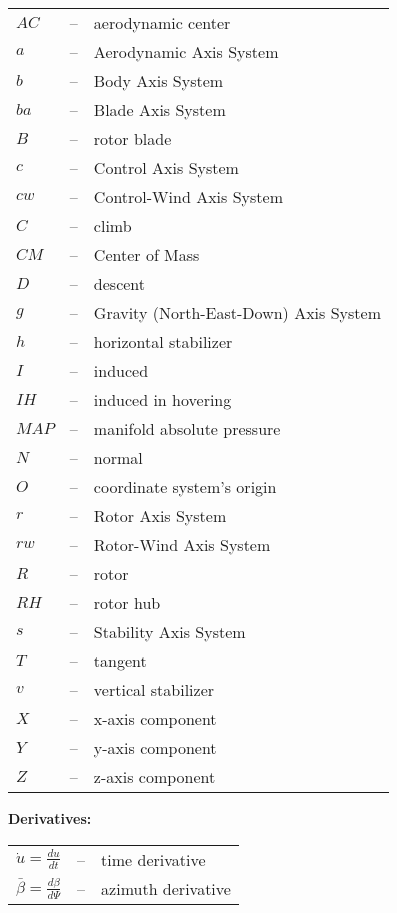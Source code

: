 \begin{longtable}[l]{ l l l }
  $AC$  & -- & aerodynamic center \\
  $a$   & -- & Aerodynamic Axis System \\
  $b$   & -- & Body Axis System \\
  $ba$  & -- & Blade Axis System \\
  $B$   & -- & rotor blade \\
  $c$   & -- & Control Axis System \\
  $cw$  & -- & Control-Wind Axis System \\
  $C$   & -- & climb \\
  $CM$  & -- & Center of Mass \\
  $D$   & -- & descent \\
  $g$   & -- & Gravity (North-East-Down) Axis System \\
  $h$   & -- & horizontal stabilizer \\
  $I$   & -- & induced \\
  $IH$  & -- & induced in hovering \\
  $MAP$ & -- & manifold absolute pressure \\
  $N$   & -- & normal \\
  $O$   & -- & coordinate system’s origin \\
  $r$   & -- & Rotor Axis System \\
  $rw$  & -- & Rotor-Wind Axis System \\
  $R$   & -- & rotor \\
  $RH$  & -- & rotor hub \\
  $s$   & -- & Stability Axis System \\
  $T$   & -- & tangent \\
  $v$   & -- & vertical stabilizer \\
  $X$   & -- & x-axis component \\
  $Y$   & -- & y-axis component \\
  $Z$   & -- & z-axis component \\
\end{longtable}

\noindent \textbf{Derivatives:}

\begin{longtable}[l]{ l l l }
  $\dot u=\frac{du}{dt}$             & -- & time derivative \\
  $\bar \beta=\frac{d\beta}{d\Psi}$  & -- & azimuth derivative \\
\end{longtable}
